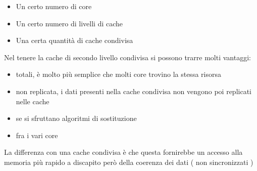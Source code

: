 \documentclass[arch.tex]{subfiles}
\begin{document}
\begin{itemize}
	\item Un certo numero di core
	\item Un certo numero di livelli di cache 
	\item Una certa quantità di cache condivisa
\end{itemize}
Nel tenere la cache di secondo livello condivisa  si possono trarre molti vantaggi:

\begin{itemize}
	\item {} totali, è molto più semplice che molti core
		trovino la stessa risorsa
	\item {} non replicata, i dati presenti nella
		 cache condivisa non vengono poi replicati nelle cache  
	\item {} se si sfruttano algoritmi di sostituzione
	\item {} fra i vari core 
\end{itemize}
La differenza con una cache   condivisa è che questa fornirebbe un
accesso alla memoria più rapido a discapito però della coerenza dei dati ( non sincronizzati ) 
\end{document}

